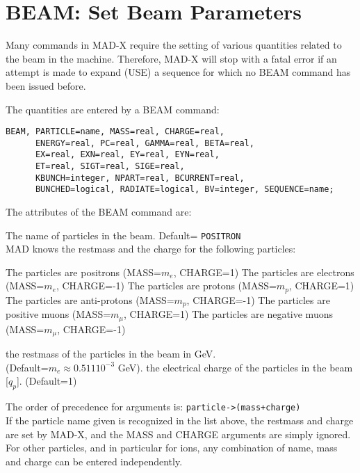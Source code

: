 %
\section{BEAM: Set Beam Parameters}
\label{sec:beam}
Many commands in MAD-X require the setting of various quantities related
to the beam in the machine. Therefore, MAD-X will stop with a fatal
error if an attempt is made to expand (USE) a sequence for which no BEAM
command has been issued before.  

The quantities are entered by a BEAM command: 
\begin{verbatim}
BEAM, PARTICLE=name, MASS=real, CHARGE=real,
      ENERGY=real, PC=real, GAMMA=real, BETA=real,
      EX=real, EXN=real, EY=real, EYN=real,
      ET=real, SIGT=real, SIGE=real,
      KBUNCH=integer, NPART=real, BCURRENT=real,
      BUNCHED=logical, RADIATE=logical, BV=integer, SEQUENCE=name;
\end{verbatim} 

The attributes of the BEAM command are: 
\begin{madlist}
   The name of particles in the beam. Default= {\tt POSITRON}\\
  MAD knows the restmass and the charge for the following particles:
  \begin{madlist}
     The particles are positrons (MASS=$m_e$, CHARGE=1)
     The particles are electrons (MASS=$m_e$, CHARGE=-1) 
     The particles are protons (MASS=$m_p$, CHARGE=1)
     The particles are anti-protons (MASS=$m_p$, CHARGE=-1) 
     The particles are positive muons (MASS=$m_{\mu}$, CHARGE=1) 
     The particles are negative muons (MASS=$m_{\mu}$, CHARGE=-1) 
  \end{madlist}
   the restmass of the particles in the beam in GeV. \\
  (Default=$m_e \approx 0.511 10^{-3}$ GeV).
  \label{beam_charge} the electrical charge of the
  particles in the beam [$q_p$]. (Default=1)
\end{madlist} 
The order of precedence for arguments is:  {\tt particle->(mass+charge)}\\ 
If the particle name given is recognized in the list above, the restmass
and charge are set by MAD-X, and the MASS and CHARGE arguments are
simply ignored. For other particles, and in particular for ions, any
combination of name, mass and charge can be entered independently.
\\

